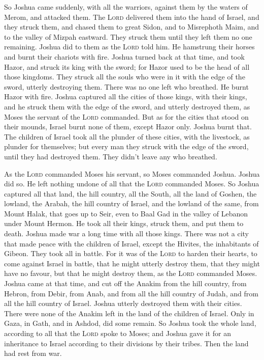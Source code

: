  So Joshua came suddenly, with all the warriors, against
them by the waters of Merom, and attacked them.  The
\textsc{Lord} delivered them into the hand of Israel, and they struck
them, and chased them to great Sidon, and to Misrephoth Maim, and to the
valley of Mizpah eastward. They struck them until they left them no one
remaining.  Joshua did to them as the \textsc{Lord} told
him. He hamstrung their horses and burnt their chariots with fire.
 Joshua turned back at that time, and took Hazor, and
struck its king with the sword; for Hazor used to be the head of all
those kingdoms.  They struck all the souls who were in it
with the edge of the sword, utterly destroying them. There was no one
left who breathed. He burnt Hazor with fire.  Joshua
captured all the cities of those kings, with their kings, and he struck
them with the edge of the sword, and utterly destroyed them, as Moses
the servant of the \textsc{Lord} commanded.  But as for
the cities that stood on their mounds, Israel burnt none of them, except
Hazor only. Joshua burnt that.  The children of Israel
took all the plunder of these cities, with the livestock, as plunder for
themselves; but every man they struck with the edge of the sword, until
they had destroyed them. They didn't leave any who breathed.

 As the \textsc{Lord} commanded Moses his servant, so
Moses commanded Joshua. Joshua did so. He left nothing undone of all
that the \textsc{Lord} commanded Moses.  So Joshua
captured all that land, the hill country, all the South, all the land of
Goshen, the lowland, the Arabah, the hill country of Israel, and the
lowland of the same,  from Mount Halak, that goes up to
Seir, even to Baal Gad in the valley of Lebanon under Mount Hermon. He
took all their kings, struck them, and put them to death.
 Joshua made war a long time with all those kings.
 There was not a city that made peace with the children
of Israel, except the Hivites, the inhabitants of Gibeon. They took all
in battle.  For it was of the \textsc{Lord} to harden
their hearts, to come against Israel in battle, that he might utterly
destroy them, that they might have no favour, but that he might destroy
them, as the \textsc{Lord} commanded Moses.  Joshua came
at that time, and cut off the Anakim from the hill country, from Hebron,
from Debir, from Anab, and from all the hill country of Judah, and from
all the hill country of Israel. Joshua utterly destroyed them with their
cities.  There were none of the Anakim left in the land
of the children of Israel. Only in Gaza, in Gath, and in Ashdod, did
some remain.  So Joshua took the whole land, according to
all that the \textsc{Lord} spoke to Moses; and Joshua gave it for an
inheritance to Israel according to their divisions by their tribes. Then
the land had rest from war.

